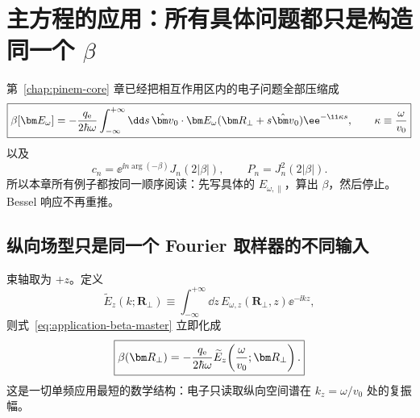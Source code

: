 \chapter{主方程的应用：所有具体问题都只是构造同一个 \texorpdfstring{$\beta$}{beta}}
\label{chap:master-applications}
\label{chap:direct-applications}

第~\ref{chap:pinem-core} 章已经把相互作用区内的电子问题全部压缩成
\begin{equation}
\boxed{
\beta[\bm E_\omega]
=-\frac{q_{\rm e}}{2\hbar\omega}
\int_{-\infty}^{+\infty}\dd s\,
\hat{\bm v}_0\cdot\bm E_\omega(\bm R_\perp+s\hat{\bm v}_0)
\ee^{-\ii\kappa s},
\qquad
\kappa\equiv\frac{\omega}{v_0}}
\label{eq:application-beta-master}
\end{equation}
以及
\begin{equation}
\boxed{
 c_n=\ee^{\ii n\arg(-\beta)}J_n(2|\beta|),
 \qquad
 P_n=J_n^2(2|\beta|).}
\label{eq:application-response-master}
\end{equation}
所以本章所有例子都按同一顺序阅读：先写具体的 \(E_{\omega,\parallel}\)，算出 \(\beta\)，然后停止。Bessel 响应不再重推。

\section{纵向场型只是同一个 Fourier 取样器的不同输入}

束轴取为 \(+z\)。定义
\begin{equation}
\widetilde E_z(k;\bm R_\perp)
\equiv
\int_{-\infty}^{+\infty}\dd z\,
E_{\omega,z}(\bm R_\perp,z)\ee^{-\ii kz},
\end{equation}
则式~\eqref{eq:application-beta-master} 立即化成
\begin{equation}
\boxed{
\beta(\bm R_\perp)
=-\frac{q_{\rm e}}{2\hbar\omega}
\widetilde E_z\!\left(\frac{\omega}{v_0};\bm R_\perp\right).}
\label{eq:beta-fourier-sample}
\end{equation}
这是一切单频应用最短的数学结构：电子只读取纵向空间谱在 \(k_z=\omega/v_0\) 处的复振幅。

